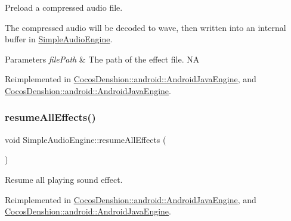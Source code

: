 Preload a compressed audio file.

The compressed audio will be decoded to wave, then written into an internal buffer in \hyperlink{classCocosDenshion_1_1SimpleAudioEngine}{Simple\+Audio\+Engine}.


\begin{DoxyParams}{Parameters}
{\em file\+Path} & The path of the effect file.  NA \\
\hline
\end{DoxyParams}


Reimplemented in \hyperlink{classCocosDenshion_1_1android_1_1AndroidJavaEngine_aa863dece58028ea4877b1215a5a9bd7c}{Cocos\+Denshion\+::android\+::\+Android\+Java\+Engine}, and \hyperlink{classCocosDenshion_1_1android_1_1AndroidJavaEngine_ab6bfd3367f805e7df12ed912e7933c22}{Cocos\+Denshion\+::android\+::\+Android\+Java\+Engine}.

\mbox{\label{classCocosDenshion_1_1SimpleAudioEngine_a502d7f9edde68126ebe1ecd9d29357e4}} 
\subsubsection{\texorpdfstring{resume\+All\+Effects()}{resumeAllEffects()}\hspace{0.1cm}{\footnotesize\ttfamily [1/2]}}
{\footnotesize\ttfamily void Simple\+Audio\+Engine\+::resume\+All\+Effects (\begin{DoxyParamCaption}{ }\end{DoxyParamCaption})\hspace{0.3cm}{\ttfamily [virtual]}}

Resume all playing sound effect. 

Reimplemented in \hyperlink{classCocosDenshion_1_1android_1_1AndroidJavaEngine_a168aac306a10c8c272636cdd1d816760}{Cocos\+Denshion\+::android\+::\+Android\+Java\+Engine}, and \hyperlink{classCocosDenshion_1_1android_1_1AndroidJavaEngine_a52558e48db6fb0dd330d18c7f569aa85}{Cocos\+Denshion\+::android\+::\+Android\+Java\+Engine}.

\mbox{\label{classCocosDenshion_1_1SimpleAudioEngine_ac268369a7565a32649c20adc69e8401c}} 
